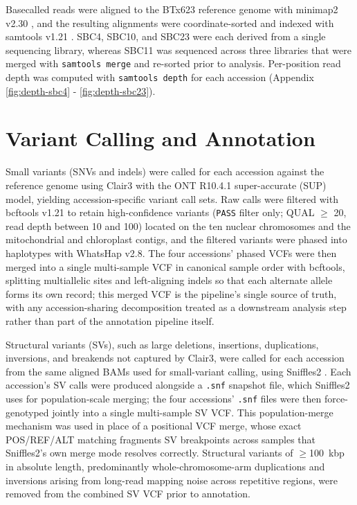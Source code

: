 \hspace{1em}Basecalled reads were aligned to the BTx623 reference genome with minimap2 v2.30 \cite{liMinimap2PairwiseAlignment2018}, and the resulting alignments were coordinate-sorted and indexed with samtools v1.21 \cite{liSequenceAlignmentMap2009}. SBC4, SBC10, and SBC23 were each derived from a single sequencing library, whereas SBC11 was sequenced across three libraries that were merged with \texttt{samtools merge} and re-sorted prior to analysis. Per-position read depth was computed with \texttt{samtools depth} for each accession (Appendix \ref{fig:depth-sbc4} - \ref{fig:depth-sbc23}).

\section{Variant Calling and Annotation}
\hspace{1em}Small variants (SNVs and indels) were called for each accession against the reference genome using Clair3 \cite{zhengSymphonizingPileupFullalignment2022} with the ONT R10.4.1 super-accurate (SUP) model, yielding accession-specific variant call sets. Raw calls were filtered with bcftools v1.21 to retain high-confidence variants (\texttt{PASS} filter only; QUAL $\geq$ 20, read depth between 10 and 100) located on the ten nuclear chromosomes and the mitochondrial and chloroplast contigs, and the filtered variants were phased into haplotypes with WhatsHap v2.8. The four accessions' phased VCFs were then merged into a single multi-sample VCF in canonical sample order with bcftools, splitting multiallelic sites and left-aligning indels so that each alternate allele forms its own record; this merged VCF is the pipeline's single source of truth, with any accession-sharing decomposition treated as a downstream analysis step rather than part of the annotation pipeline itself.

\hspace{1em}Structural variants (SVs), such as large deletions, insertions, duplications, inversions, and breakends not captured by Clair3, were called for each accession from the same aligned BAMs used for small-variant calling, using Sniffles2 \cite{smolkaDetectionMosaicPopulationlevel2024}. Each accession's SV calls were produced alongside a \texttt{.snf} snapshot file, which Sniffles2 uses for population-scale merging; the four accessions' \texttt{.snf} files were then force-genotyped jointly into a single multi-sample SV VCF. This population-merge mechanism was used in place of a positional VCF merge, whose exact POS/REF/ALT matching fragments SV breakpoints across samples that Sniffles2's own merge mode resolves correctly. Structural variants of $\geq$100~kbp in absolute length, predominantly whole-chromosome-arm duplications and inversions arising from long-read mapping noise across repetitive regions, were removed from the combined SV VCF prior to annotation.

